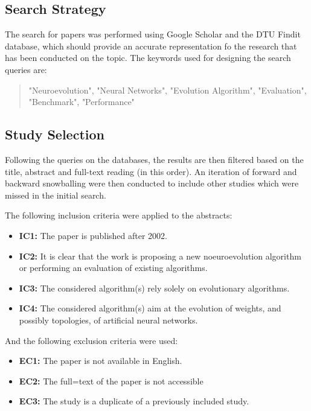 \subsection{Search Strategy}

The search for papers was performed using Google Scholar and the DTU Findit database, which should provide an accurate representation fo the research that has been
conducted on the topic. The keywords used for designing the search queries are:

\begin{quote}
    "Neuroevolution", "Neural Networks", "Evolution Algorithm", "Evaluation", "Benchmark", "Performance"
\end{quote}

\subsection{Study Selection}

Following the queries on the databases, the results are then filtered based on the title, abstract and full-text reading (in this order). An iteration of forward
and backward snowballing were then conducted to include other studies which were missed in the initial search.

The following inclusion criteria were applied to the abstracts:

\begin{itemize}
    \item \textbf{IC1:} The paper is published after 2002.
    \item \textbf{IC2:} It is clear that the work is proposing a new noeuroevolution algorithm or performing an evaluation of existing algorithms.
    \item \textbf{IC3:} The considered algorithm(s) rely solely on evolutionary algorithms.
    \item \textbf{IC4:} The considered algorithm(s) aim at the evolution of weights, and possibly topologies, of artificial neural networks.
\end{itemize}

And the following exclusion criteria were used:

\begin{itemize}
    \item \textbf{EC1:} The paper is not available in English.
    \item \textbf{EC2:} The full=text of the paper is not accessible
    \item \textbf{EC3:} The study is a duplicate of a previously included study.
\end{itemize}

